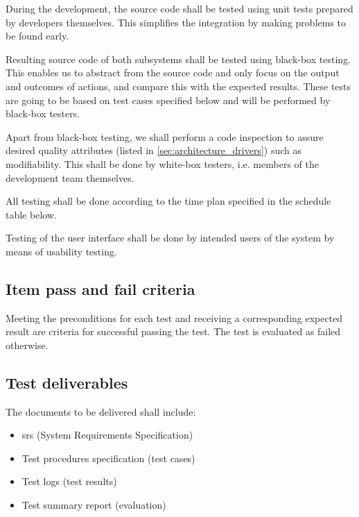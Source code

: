 \documentclass[11pt]{book}
\begin{document}
During the development, the source code shall be tested using unit tests prepared by developers themselves. This simplifies the integration by making problems to be found early.

Resulting source code of both subsystems shall be tested using black-box testing. This enables us to abstract from the source code and only focus on the output and outcomes of actions, and compare this with the expected results. These tests are going to be based on test cases specified below and will be performed by black-box testers.

Apart from black-box testing, we shall perform a code inspection to assure desired quality attributes (listed in \ref{sec:architecture_drivers}) such as modifiability. This shall be done by white-box testers, i.e. members of the development team themselves.

All testing shall be done according to the time plan specified in the schedule table below.

Testing of the user interface shall be done by intended users of the system by means of usability testing. %

\subsection{Item pass and fail criteria}
Meeting the preconditions for each test and receiving a corresponding expected result are criteria for successful passing the test. The test is evaluated as failed otherwise.


\subsection{Test deliverables}
The documents to be delivered shall include:

\begin{itemize}
    \item \gls{srs} (System Requirements Specification)
    \item Test procedures specification (test cases)
    \item Test logs (test results)
    \item Test summary report (evaluation)
\end{itemize}
\end{document}
